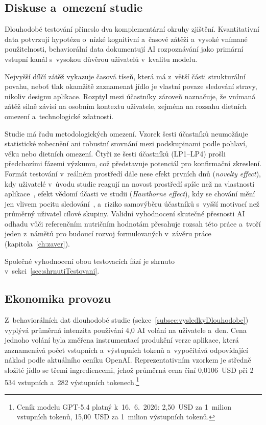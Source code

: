 \subsection{Diskuse a~omezení studie}
\label{subsec:omezeniDlouhodobe}

Dlouhodobé testování přineslo dva komplementární okruhy zjištění.
Kvantitativní data potvrzují hypotézu o~nízké kognitivní a~časové zátěži a~vysoké vnímané použitelnosti, behaviorální data dokumentují AI rozpoznávání jako primární vstupní kanál s~vysokou důvěrou uživatelů v~kvalitu modelu.

Nejvyšší dílčí zátěž vykazuje časová tíseň, která má z~větší části strukturální povahu, neboť tlak okamžitě zaznamenat jídlo je vlastní povaze sledování stravy, nikoliv designu aplikace.
Rozptyl mezi účastníky zároveň naznačuje, že vnímaná zátěž silně závisí na osobním kontextu uživatele, zejména na rozsahu dietních omezení a~technologické zdatnosti.

Studie má řadu metodologických omezení.
Vzorek šesti účastníků neumožňuje statistické zobecnění ani robustní srovnání mezi podskupinami podle pohlaví, věku nebo dietních omezení.
Čtyři ze šesti účastníků (LP1--LP4) prošli předchozími fázemi výzkumu, což představuje potenciál pro konfirmační zkreslení.
Formát testování v~reálném prostředí dále nese efekt prvních dnů (\emph{novelty effect}), kdy uživatelé v~úvodu studie reagují na novost prostředí spíše než na vlastnosti aplikace~\cite{clark1983reconsidering}, efekt vědomí účasti ve studii (\emph{Hawthorne effect}), kdy se chování mění jen vlivem pocitu sledování~\cite{mccambridge2014hawthorne}, a~riziko samovýběru účastníků s~vyšší motivací než průměrný uživatel cílové skupiny.
Validní vyhodnocení skutečné přesnosti AI odhadu vůči referenčním nutričním hodnotám přesahuje rozsah této práce a~tvoří jeden z~námětů pro budoucí rozvoj formulovaných v~závěru práce (kapitola~\ref{ch:zaver}).

Společné vyhodnocení obou testovacích fází je shrnuto v~sekci~\ref{sec:shrnutiTestovani}.

\subsection{Ekonomika provozu}
\label{subsec:ekonomikaDlouhodobe}

Z~behaviorálních dat dlouhodobé studie (sekce~\ref{subsec:vysledkyDlouhodobe}) vyplývá průměrná intenzita používání 4{,}0 AI volání na uživatele a~den. Cena jednoho volání byla změřena instrumentací produkční verze aplikace, která zaznamenává počet vstupních a~výstupních tokenů a~vypočítává odpovídající náklad podle aktuálního ceníku OpenAI. Reprezentativním vzorkem je středně složité jídlo se třemi ingrediencemi, jehož průměrná cena činí 0{,}0106~USD při 2\,534 vstupních a~282 výstupních tokenech.\footnote{Ceník modelu GPT-5.4 platný k~16.~6.~2026: 2{,}50~USD za 1~milion vstupních tokenů, 15{,}00~USD za 1~milion výstupních tokenů.}

